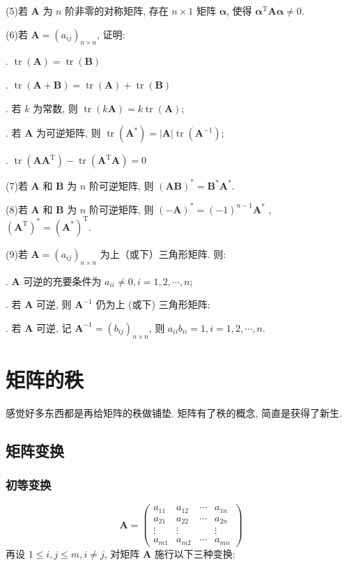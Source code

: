 \documentclass{article}
\begin{document}
(5)若 $\boldsymbol{A}$ 为 $n$ 阶非零的对称矩阵, 存在 $n \times 1$ 矩阵 $\boldsymbol{\alpha}$, 使得 $\boldsymbol{\alpha}^{\mathrm{T}} \boldsymbol{A} \boldsymbol{\alpha} \neq 0$.

(6)若 $\boldsymbol{A}=\left(a_{i j}\right)_{n \times n}$, 证明:

. $\operatorname{tr}(\boldsymbol{A})=\operatorname{tr}(\boldsymbol{B})$

. $\operatorname{tr}(\boldsymbol{A}+\boldsymbol{B})=\operatorname{tr}(\boldsymbol{A})+\operatorname{tr}(\boldsymbol{B})$

. 若 $k$ 为常数, 则 $\operatorname{tr}(k \boldsymbol{A})=k \operatorname{tr}(\boldsymbol{A})$;

. 若 $\boldsymbol{A}$ 为可逆矩阵, 则 $\operatorname{tr}\left(\boldsymbol{A}^{*}\right)=|\boldsymbol{A}| \operatorname{tr}\left(\boldsymbol{A}^{-1}\right)$;

. $\operatorname{tr}\left(\boldsymbol{A} \boldsymbol{A}^{\mathrm{T}}\right)-\operatorname{tr}\left(\boldsymbol{A}^{\mathrm{T}} \boldsymbol{A}\right)=0$

(7)若 $\boldsymbol{A}$ 和 $\boldsymbol{B}$ 为 $n$ 阶可逆矩阵, 则 $(\boldsymbol{A B})^{*}=\boldsymbol{B}^{*} \boldsymbol{A}^{*}$.

(8)若 $\boldsymbol{A}$ 和 $\boldsymbol{B}$ 为 $n$ 阶可逆矩阵, 则
$(-\boldsymbol{A})^{*}=(-1)^{n-1} \boldsymbol{A}^{*}$
,$\left(\boldsymbol{A}^{\mathrm{T}}\right)^{*}=\left(\boldsymbol{A}^{*}\right)^{\mathrm{T}} .$

(9)若 $\boldsymbol{A}=\left(a_{i j}\right)_{n \times n}$ 为上（或下）三角形矩阵. 则:

. $\boldsymbol{A}$ 可逆的充要条件为 $a_{i i} \neq 0, i=1,2, \cdots, n$;

. 若 $\boldsymbol{A}$ 可逆, 则 $\boldsymbol{A}^{-1}$ 仍为上 (或下) 三角形矩阵;

. 若 $\boldsymbol{A}$ 可逆, 记 $\boldsymbol{A}^{-1}=\left(b_{i j}\right)_{n \times n}$, 则 $a_{i i} b_{i i}=1, i=1,2, \cdots, n$.
\section{矩阵的秩}
感觉好多东西都是再给矩阵的秩做铺垫. 矩阵有了秩的概念, 简直是获得了新生.

\subsection{矩阵变换}
\subsubsection{初等变换}
$$
\boldsymbol{A}=\left(\begin{array}{cccc}
	a_{11} & a_{12} & \cdots & a_{1 n} \\
	a_{21} & a_{22} & \cdots & a_{2 n} \\
	\vdots & \vdots & & \vdots \\
	a_{m 1} & a_{m 2} & \cdots & a_{m n}
\end{array}\right)
$$
再设 $1 \leq i, j \leq m, i \neq j$, 对矩阵 $\boldsymbol{A}$ 施行以下三种变换:
\end{document}
